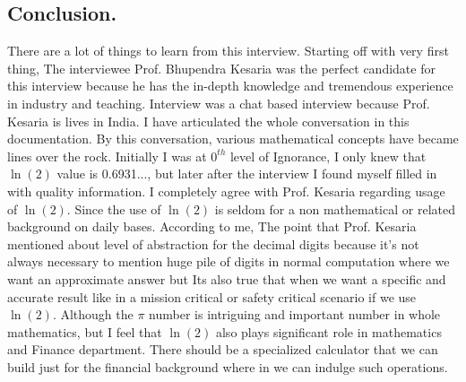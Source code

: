 \documentclass{article}
\begin{document}
\newpage
\subsection{Conclusion.}
\quad \quad \quad There are a lot of things to learn from this interview. Starting off with very first thing, The interviewee Prof. Bhupendra Kesaria was the perfect candidate for this interview because he has the in-depth knowledge and tremendous experience in industry and teaching. Interview was a chat based interview because Prof. Kesaria is lives in India. I have articulated the whole conversation in this documentation. By this conversation, various mathematical concepts have became lines over the rock. Initially I was at $0^{th}$ level of Ignorance, I only knew that $\ln(2)$ value is 0.6931..., but later after the interview I found myself filled in with quality information. I completely agree with Prof. Kesaria regarding usage of $\ln(2)$. Since the use of $\ln(2)$ is seldom for a non mathematical or related background on daily bases.
\newline
According to me, The point that Prof. Kesaria mentioned about level of abstraction for the decimal digits because it's not always necessary to mention huge pile of digits in normal computation where we want an approximate answer but Its also true that when we want a specific and accurate result like in a mission critical or safety critical scenario if we use $\ln(2)$.
\newline
Although the $\pi$ number is intriguing and important number in whole mathematics, but I feel that $\ln(2)$ also plays significant role in mathematics and Finance department. There should be a specialized calculator that we can build just for the financial background where in we can indulge such operations.
\end{document}
